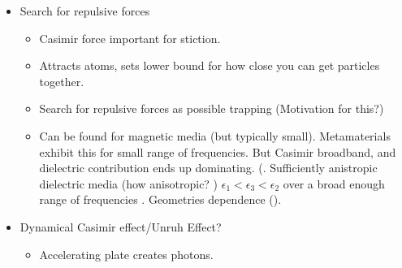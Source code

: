\begin{itemize}
\item Search for repulsive forces

\begin{itemize}
\item Casimir force important for stiction.
\item Attracts atoms, sets lower bound for how close you can get particles together.
\item Search for repulsive forces as possible trapping (Motivation for this?)
\item Can be found for magnetic media (but typically small).
  Metamaterials exhibit this for small range of frequencies.
  But Casimir broadband, and dielectric contribution ends up dominating.
  (.
Sufficiently anistropic dielectric media (how anisotropic? )
 $\epsilon_1<\epsilon_3<\epsilon_2$ over a broad enough range of frequencies 
.
   Geometries dependence ().
\end{itemize}
\item Dynamical Casimir effect/Unruh Effect?
\begin{itemize}
  \item Accelerating plate creates photons.  
\end{itemize}
\end{itemize}



